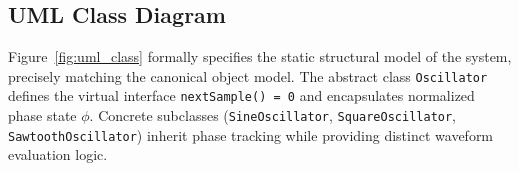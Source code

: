 \documentclass[12pt,a4paper,oneside]{book}
\begin{document}
\FloatBarrier

\subsection{UML Class Diagram}
Figure~\ref{fig:uml_class} formally specifies the static structural model of the system, precisely matching the canonical object model. The abstract class \texttt{Oscillator} defines the virtual interface \texttt{nextSample() = 0} and encapsulates normalized phase state $\phi$. Concrete subclasses (\texttt{SineOscillator}, \texttt{SquareOscillator}, \texttt{SawtoothOscillator}) inherit phase tracking while providing distinct waveform evaluation logic.
\end{document}
